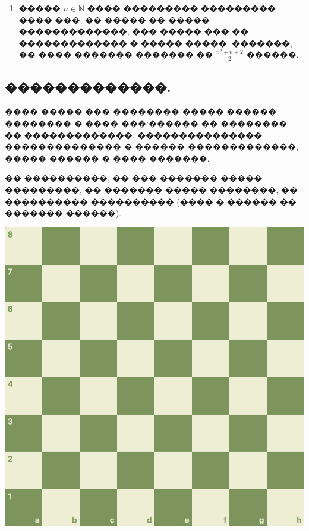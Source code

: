 \documentclass[a4paper,12pt]{article}
\begin{document}
\begin{enumerate}
\item ����� $n\in \mathbb{N}$ ���� ��������� ��������� ���� ���, �� ����� �� ����� �������������, ��� ����� ��� �� ������������� � ����� �����. �������, �� ���� ������� ������� �� $\frac{n^{2}+n+2}{2}$ ������.

\end{enumerate}





\newpage

\begin{center}
\section*{�������������.}
\end{center}

\medskip

\begin{minipage}{.45\textwidth}
\quad ���� ����� ��� �������� ����� ������ �������� � ���� ���`������ �� �������� �� �������������. ��������������� �������������� � ������ �������������, ����� ������ � ���� �������.

\medskip

\quad �� ����������, �� ��� ������� ����� ���������, �� ������� ����� ��������, �� ���������� ���������� (���� � ������ �� ������� ������).
\end{minipage}
\begin{minipage}{.45\textwidth}
\begin{center}
\includegraphics[scale=0.17]{chessboard.png}
\end{center}
\end{minipage}
\end{document}
